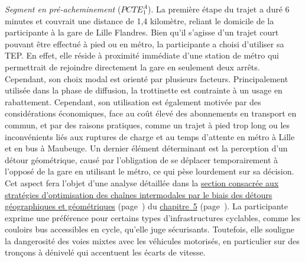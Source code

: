 \begin{refsegment}
\textsl{Segment en pré-acheminement} (\(PCTE^{A}_{1}\)). La première étape du trajet a duré 6 minutes et couvrait une distance de 1,4 kilomètre, reliant le domicile de la participante à la gare de Lille Flandres. Bien qu’il s’agisse d’un trajet court pouvant être effectué à pied ou en métro, la participante a choisi d’utiliser sa \acrshort{TEP}. En effet, elle réside à proximité immédiate d’une station de métro qui permettrait de rejoindre directement la gare en seulement deux arrêts. Cependant, son choix modal est orienté par plusieurs facteurs. Principalement utilisée dans la phase de diffusion, la trottinette est contrainte à un usage en rabattement. Cependant, son utilisation est également motivée par des considérations économiques, face au coût élevé des abonnements en transport en commun, et par des raisons pratiques, comme un trajet à pied trop long ou les inconvénients liés aux ruptures de charge et au temps d’attente en métro à Lille et en bus à Maubeuge. Un dernier élément déterminant est la perception d’un \gls{détour} géométrique, causé par l’obligation de se déplacer temporairement à l’opposé de la gare en utilisant le métro, ce qui pèse lourdement sur sa décision. Cet aspect fera l’objet d’une analyse détaillée dans la \hyperref[chap5:detours-pauses-optimisation]{section consacrée aux stratégies d'optimisation des chaînes intermodales par le biais des détours géographiques et géométriques} (page~\pageref{chap5:detours-pauses-optimisation}) du \hyperref[chap5:titre]{chapitre~5} (page~\pageref{chap5:titre}). La participante exprime une préférence pour certains types d’infrastructures cyclables, comme les couloirs bus accessibles en cycle, qu’elle juge sécurisants. Toutefois, elle souligne la dangerosité des voies mixtes avec les véhicules motorisés, en particulier sur des tronçons à dénivelé qui accentuent les écarts de vitesse.%


\end{refsegment}
